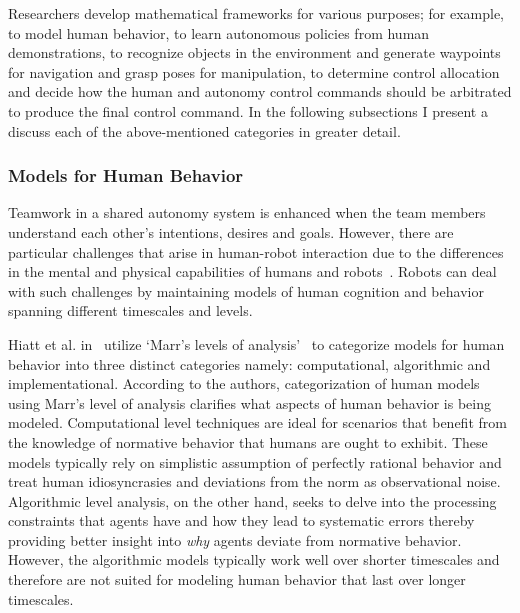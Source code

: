 \documentclass[12pt]{article}
\begin{document}
Researchers develop mathematical frameworks for various purposes; for example, to model human behavior, to learn autonomous policies from human demonstrations, to recognize objects in the environment and generate waypoints for navigation and grasp poses for manipulation, to determine control allocation and decide how the human and autonomy control commands should be arbitrated to produce the final control command. In the following subsections I present a discuss each of the above-mentioned categories in greater detail.  

\subsubsection{Models for Human Behavior}
Teamwork in a shared autonomy system is enhanced when the team members understand each other's intentions, desires and goals. However, there are particular challenges that arise in human-robot interaction due to the differences in the mental and physical capabilities of humans and robots~\cite{hiatt2017human}. Robots can deal with such challenges by maintaining models of human cognition and behavior~\cite{javdani2015shared} spanning different timescales and levels. 

Hiatt et al. in~\cite{hiatt2017human} utilize `Marr's levels of analysis'~\cite{marr1982vision} to categorize models for human behavior into three distinct categories namely: computational, algorithmic and implementational.
According to the authors, categorization of human models using Marr's level of analysis clarifies what aspects of human behavior is being modeled. Computational level techniques are ideal for scenarios that benefit from the knowledge of normative behavior that humans are ought to exhibit. These models typically rely on simplistic assumption of perfectly rational behavior and treat human idiosyncrasies and deviations from the norm as observational noise. Algorithmic level analysis, on the other hand, seeks to delve into the processing constraints that agents have and how they lead to systematic errors thereby providing better insight into \textit{why} agents deviate from normative behavior. However, the algorithmic models typically work well over shorter timescales and therefore are not suited for modeling human behavior that last over longer timescales. 
\end{document}
